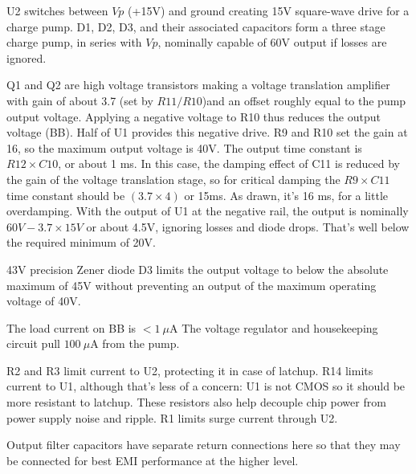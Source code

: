 \documentclass[a4paper,12pt]{article}
\begin{document}

U2 switches between $Vp$ (+15V) and ground creating 15V square-wave drive for a charge pump. D1, D2, D3, and their associated capacitors form a three stage charge pump, in series with $Vp$, nominally capable of 60V output if losses are ignored. 

Q1 and Q2 are high voltage transistors making a voltage translation amplifier with gain of about 3.7 (set by $R11/R10$)and an offset roughly equal to the pump output voltage. Applying a negative voltage to R10 thus reduces the output voltage (BB). Half of U1 provides this negative drive. R9 and R10 set the gain at 16, so the maximum output voltage is 40V. The output time constant is $R12\times C10$, or about 1 ms. In this case, the damping effect of C11 is reduced by the gain of the voltage translation stage, so for critical damping the $R9\times C11$ time constant should be $(3.7\times4)$ or 15ms. As drawn, it's 16 ms, for a little overdamping. With the output of U1 at the negative rail, the output is nominally $60V-3.7\times15V$ or about 4.5V, ignoring losses and diode drops. That's well below the required minimum of 20V.

43V precision Zener diode D3 limits the output voltage to below the absolute maximum of 45V without preventing an output of the maximum operating voltage of 40V.

The load current on BB is $<1\ \mu$A The voltage regulator and housekeeping circuit pull $100\ \mu$A from the pump.

R2 and R3 limit current to U2, protecting it in case of latchup. R14 limits current to U1, although that's less of a concern: U1 is not CMOS so it should be more resistant to latchup. These resistors also help decouple chip power from power supply noise and ripple. R1 limits surge current through U2.

Output filter capacitors have separate return connections here so that they may be connected for best EMI performance at the higher level.

%
\end{document}
